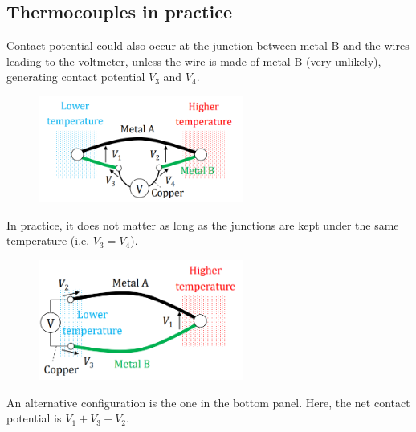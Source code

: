 \documentclass[class=report, crop=false, 12pt,a4paper]{standalone}
\begin{document}
\subsection{Thermocouples in practice}
Contact potential could also occur at the junction between metal B and the wires leading to the voltmeter, unless the wire is made of metal B (very unlikely), generating contact potential $V_3$ and $V_4$.
\begin{figure}[H]
  \centering
  \includegraphics[width = 0.6\textwidth]{../img/Mdiagram62.png}
\end{figure}
In practice, it does not matter as long as the junctions are kept under the same temperature (i.e. $V_3 = V_4$).
\begin{figure}[H]
  \centering
  \includegraphics[width = 0.6\textwidth]{../img/Mdiagram63.png}
\end{figure}
An alternative configuration is the one in the bottom panel. Here, the net contact potential is $V_1+V_3-V_2$.
\end{document}
